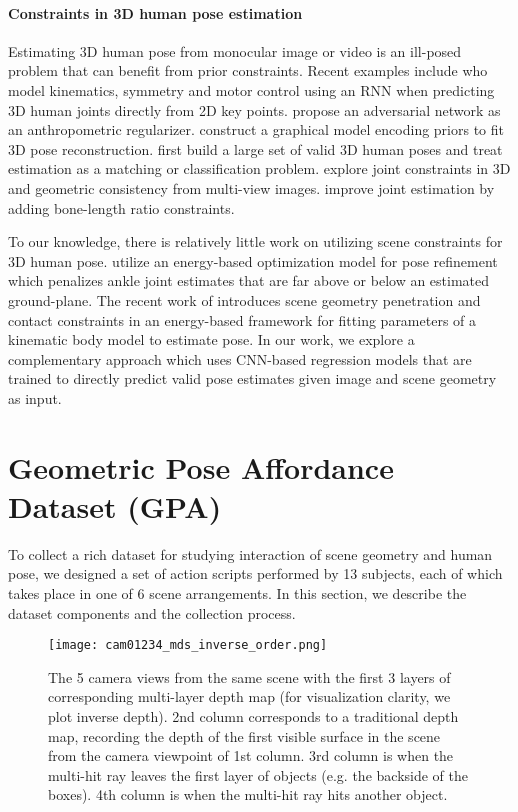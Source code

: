 \documentclass[times,referee,twocolumn,final,authoryear]{elsarticle}
\begin{document}
\paragraph{Constraints in 3D human pose estimation} Estimating 3D human pose
from monocular image or video is an ill-posed problem that can benefit from
prior constraints. Recent examples include \cite{rnnpose} who model kinematics, 
symmetry and motor control using an RNN when predicting 3D human joints directly
from 2D key points. \cite{adversialpose} propose an  adversarial network as an 
anthropometric regularizer.  \cite{graphicalmodel,zhou2018monocap} construct a 
graphical model encoding priors to fit 3D pose reconstruction.
\cite{LCRnet++,posematching} first build a large set of valid 3D human poses and 
treat estimation as a matching or classification problem.
\cite{jointconstraint,geometryaware} explore joint constraints in 3D and
geometric consistency from multi-view images.  \cite{Zhou_2017_ICCV} improve
joint estimation by adding bone-length ratio constraints.



To our knowledge, there is relatively little work on utilizing scene constraints
for 3D human pose. \cite{groundconstraint} utilize an energy-based optimization model for
pose refinement which penalizes ankle joint estimates that are far above or below 
an estimated ground-plane. The recent work of \cite{mpii_scene} introduces
scene geometry penetration and contact constraints in an energy-based framework for 
fitting parameters of a kinematic body model to estimate pose. In our work, we 
explore a complementary approach which uses CNN-based regression
models that are trained to directly predict valid pose estimates given image and 
scene geometry as input.


\section{Geometric Pose Affordance Dataset (GPA)}

To collect a rich dataset for studying interaction of scene geometry and human
pose, we designed a set of action scripts performed by 13 subjects, each of
which takes place in one of 6 scene arrangements.  In this section, we describe
the dataset components and the collection process.  

\begin{figure*}[!bht]
\begin{center}
   \texttt{[image: cam01234\_mds\_inverse\_order.png]}
\end{center}
   \caption{The 5 camera views from the same scene with the
   first 3 layers of corresponding multi-layer depth map (for visualization
   clarity, we plot inverse depth). 2nd column corresponds to a traditional
   depth map, recording the depth of the first visible surface in the scene from
   the camera viewpoint of 1st column. 3rd column is when the multi-hit ray
   leaves the first layer of objects (e.g. the backside of the boxes). 4th column is 
   when the multi-hit ray hits another object.
}
\label{fig:camera01234_mds}
\end{figure*}
\end{document}
